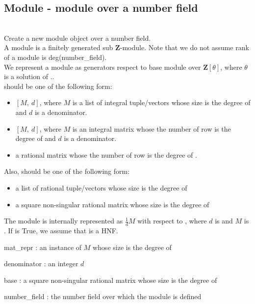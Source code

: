\subsection{Module - module over a number field}
 \initialize
  \\
  \spacing
  \quad Create a new module object over a number field.\\
  \spacing
  \quad A module is a finitely generated sub $\mathbf{Z}$-module. 
  Note that we do not assume rank of a module is deg(number\_field).\\
  We represent a module as generators respect to base module over $\mathbf{Z}[\theta]$, where $\theta$ is a solution of ..\\
  \spacing
  \quad {} should be one of the following form:
  \begin{itemize}
  \item $[M,\ d]$, 
   where $M$ is a list of integral tuple/vectors whose size is the degree of  and
         $d$ is a denominator.
  \item $[M,\ d]$,
   where $M$ is an integral matrix whose the number of row is the degree of  and
         $d$ is a denominator.
  \item a rational matrix whose the number of row is the degree of .
  \end{itemize}
  Also,  should be one of the following form:
  \begin{itemize}
  \item {} a list of rational tuple/vectors whose size is the degree of 
  \item a square non-singular rational matrix whose size is the degree of 
  \end{itemize}
  The module is internally represented as $\frac{1}{d}M$ with respect to ,
  where $d$ is  and $M$ is .
  If  is True, we assume that  is a HNF.\\
  \begin{at}
  \item[mat\_repr]: an instance of  $M$ whose size is the degree of 
  \item[denominator]: an integer $d$
  \item[base]: a square non-singular rational matrix whose size is the degree of 
  \item[number\_field]: the number field over which the module is defined
  \end{at}
